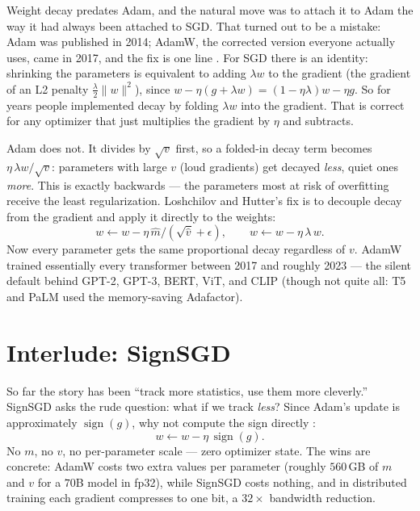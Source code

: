 \documentclass[10pt,conference]{IEEEtran}
\newcommand{\sign}{\operatorname{sign}}
\begin{document}
Weight decay predates Adam, and the natural move was to attach it to Adam the way
it had always been attached to SGD. That turned out to be a mistake: Adam was
published in 2014; AdamW, the corrected version everyone actually uses, came in
2017, and the fix is one line \cite{ref4}. For SGD there is an identity:
shrinking the parameters is equivalent to adding $\lambda w$ to the gradient
(the gradient of an L2 penalty $\tfrac{\lambda}{2}\|w\|^2$), since
$w-\eta(g+\lambda w)=(1-\eta\lambda)w-\eta g$. So for years people implemented
decay by folding $\lambda w$ into the gradient. That is correct for any optimizer
that just multiplies the gradient by $\eta$ and subtracts.

Adam does not. It divides by $\sqrt{v}$ first, so a folded-in decay term becomes
$\eta\,\lambda w/\sqrt{v}$: parameters with large $v$ (loud gradients) get decayed
\emph{less}, quiet ones \emph{more}. This is exactly backwards --- the parameters
most at risk of overfitting receive the least regularization. Loshchilov and
Hutter's fix \cite{ref4} is to
decouple decay from the gradient and apply it directly to the weights:
\begin{equation}
w \leftarrow w - \eta\, \hat m/(\sqrt{\hat v}+\epsilon), \qquad
w \leftarrow w - \eta\,\lambda\, w.
\end{equation}
Now every parameter gets the same proportional decay regardless of $v$. AdamW trained essentially every transformer
between 2017 and roughly 2023 --- the silent default behind GPT-2, GPT-3, BERT,
ViT, and CLIP (though not quite all: T5 and PaLM used the memory-saving Adafactor).

\section{Interlude: SignSGD}
So far the story has been ``track more statistics, use them more cleverly.''
SignSGD asks the rude question: what if we track \emph{less}? Since Adam's update
is approximately $\sign(g)$, why not compute the sign directly \cite{ref5}:
\begin{equation}
w \leftarrow w - \eta\, \sign(g).
\end{equation}
No $m$, no $v$, no per-parameter scale --- zero optimizer state. The wins are
concrete: AdamW costs two extra values per parameter (roughly $560$\,GB of $m$ and
$v$ for a $70$B model in fp32), while SignSGD costs nothing, and in distributed
training each gradient compresses to one bit, a $32\times$ bandwidth reduction.
\end{document}
